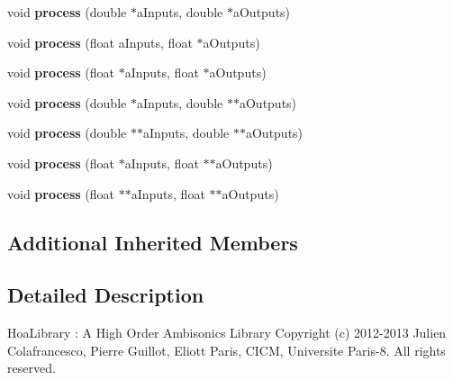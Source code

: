 \begin{DoxyCompactItemize}
\item 
\hypertarget{class_ambisonics_ring_modulation_a01935cefd40a22a74e77b0088931be2b}{void {\bfseries process} (double $\ast$a\-Inputs, double $\ast$a\-Outputs)}\label{class_ambisonics_ring_modulation_a01935cefd40a22a74e77b0088931be2b}

\item 
\hypertarget{class_ambisonics_ring_modulation_a1f2ef2520da7f2f6a9a459363ae7f35a}{void {\bfseries process} (float a\-Inputs, float $\ast$a\-Outputs)}\label{class_ambisonics_ring_modulation_a1f2ef2520da7f2f6a9a459363ae7f35a}

\item 
\hypertarget{class_ambisonics_ring_modulation_a14df064d9535f3acd981498f49e1f5b4}{void {\bfseries process} (float $\ast$a\-Inputs, float $\ast$a\-Outputs)}\label{class_ambisonics_ring_modulation_a14df064d9535f3acd981498f49e1f5b4}

\item 
\hypertarget{class_ambisonics_ring_modulation_a6bc07d756bf57a86aed2be12f9122b38}{void {\bfseries process} (double $\ast$a\-Inputs, double $\ast$$\ast$a\-Outputs)}\label{class_ambisonics_ring_modulation_a6bc07d756bf57a86aed2be12f9122b38}

\item 
\hypertarget{class_ambisonics_ring_modulation_add91a033406ecee996e4711d3886a573}{void {\bfseries process} (double $\ast$$\ast$a\-Inputs, double $\ast$$\ast$a\-Outputs)}\label{class_ambisonics_ring_modulation_add91a033406ecee996e4711d3886a573}

\item 
\hypertarget{class_ambisonics_ring_modulation_a28613c6364b419ad572990f9cd7c4c57}{void {\bfseries process} (float $\ast$a\-Inputs, float $\ast$$\ast$a\-Outputs)}\label{class_ambisonics_ring_modulation_a28613c6364b419ad572990f9cd7c4c57}

\item 
\hypertarget{class_ambisonics_ring_modulation_a55e04e61ba7deb41f9d90c16ec2bebef}{void {\bfseries process} (float $\ast$$\ast$a\-Inputs, float $\ast$$\ast$a\-Outputs)}\label{class_ambisonics_ring_modulation_a55e04e61ba7deb41f9d90c16ec2bebef}

\end{DoxyCompactItemize}
\subsection*{Additional Inherited Members}


\subsection{Detailed Description}
Hoa\-Library \-: A High Order Ambisonics Library Copyright (c) 2012-\/2013 Julien Colafrancesco, Pierre Guillot, Eliott Paris, C\-I\-C\-M, Universite Paris-\/8. All rights reserved.

